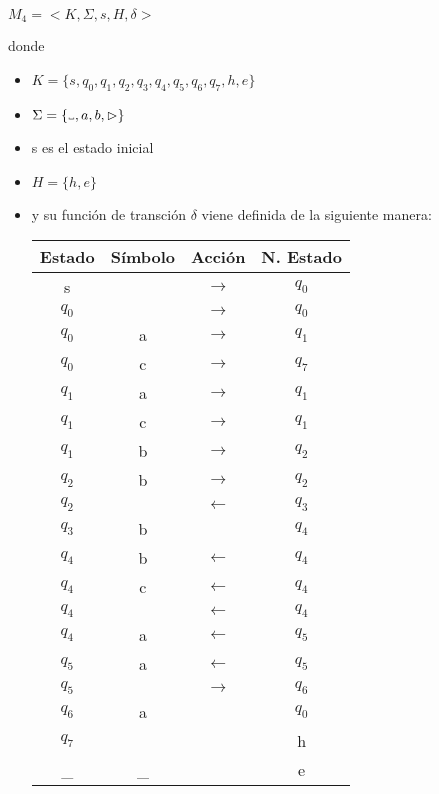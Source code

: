 \documentclass[11pt, a4paper, titlepage]{article}
\newcommand\vartextvisiblespace[1][.5em]{%
  \makebox[#1]{%
    \kern.07em
    \vrule height.3ex
    \hrulefill
    \vrule height.3ex
    \kern.07em
  }%
}
\begin{document}
$ M_4 = < K, \Sigma, s, H, \delta >$

donde
\begin{itemize}
\item $ K = \{ s, q_0, q_1, q_2, q_3, q_4, q_5, q_6, q_7, h, e \}$
\item $ \Sigma = \{\vartextvisiblespace, a, b, \rhd \}$
\item s es el estado inicial
\item $ H = \{ h, e \}$
\item y su función de transción $\delta$ viene definida de la siguiente manera:
  \begin{center}
    \begin{tabular}{|| c c c c ||}
      \hline
      Estado & Símbolo & Acción & N. Estado \\ [0.5ex]
      \hline\hline
      s & \vartextvisiblespace & $\rightarrow$ & $q_0$ \\
      \hline
      $q_0$ & \vartextvisiblespace & $\rightarrow$ & $q_0$ \\
      \hline
      $q_0$ & a & $\rightarrow$ & $q_1$ \\
      \hline
      $q_0$ & c & $\rightarrow$ & $q_7$ \\
      \hline
      $q_1$ & a & $\rightarrow$ & $q_1$ \\
      \hline
      $q_1$ & c & $\rightarrow$ & $q_1$ \\
      \hline
      $q_1$ & b & $\rightarrow$ & $q_2$ \\
      \hline
      $q_2$ & b & $\rightarrow$ & $q_2$ \\
      \hline
      $q_2$ & \vartextvisiblespace & $\leftarrow$ & $q_3$ \\
      \hline
      $q_3$ & b & \vartextvisiblespace & $q_4$ \\
      \hline
      $q_4$ & b & $\leftarrow$ & $q_4$ \\
      \hline
      $q_4$ & c & $\leftarrow$ & $q_4$ \\
      \hline
      $q_4$ & \vartextvisiblespace & $\leftarrow$ & $q_4$ \\
      \hline
      $q_4$ & a & $\leftarrow$ & $q_5$ \\
      \hline
      $q_5$ & a & $\leftarrow$ & $q_5$ \\
      \hline
      $q_5$ & \vartextvisiblespace & $\rightarrow$ & $q_6$ \\
      \hline
      $q_6$ & a & \vartextvisiblespace & $q_0$ \\
      \hline
      $q_7$ & \vartextvisiblespace & \vartextvisiblespace & h \\
      \hline
      \_ & \_ & \vartextvisiblespace & e \\
      \hline
    \end{tabular}
\end{center}
\end{itemize}
\end{document}
